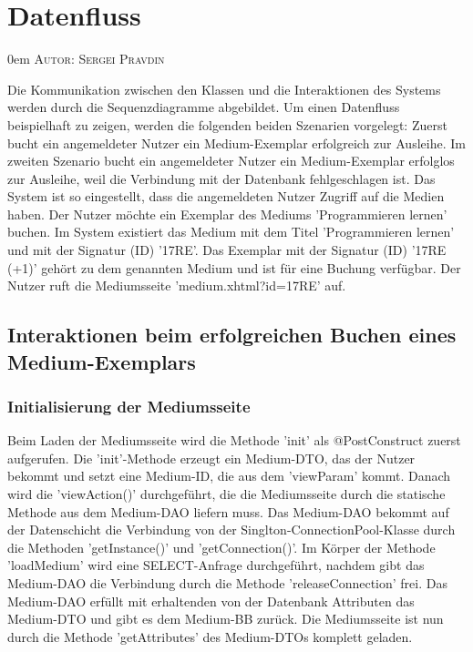 \documentclass{article}
\makeatletter
\newcommand{\sectionauthor}[1]{
	{\parindent 0em \large \scshape Autor: #1 \par \nobreak \vspace*{1em}}
	\@afterheading
}
\makeatother
\begin{document}






\newpage
\section{Datenfluss}
\sectionauthor{Sergei Pravdin}
Die Kommunikation zwischen den Klassen und die Interaktionen des Systems werden durch die Sequenzdiagramme abgebildet. Um einen Datenfluss beispielhaft zu zeigen, werden die folgenden beiden Szenarien vorgelegt: Zuerst bucht ein angemeldeter Nutzer ein Medium-Exemplar erfolgreich zur Ausleihe. Im zweiten Szenario bucht ein angemeldeter Nutzer ein Medium-Exemplar erfolglos zur Ausleihe, weil die Verbindung mit der Datenbank fehlgeschlagen ist. Das System ist so eingestellt, dass die angemeldeten Nutzer Zugriff auf die Medien haben. Der Nutzer möchte ein Exemplar des Mediums 'Programmieren lernen' buchen. Im System existiert das Medium mit dem Titel 'Programmieren lernen' und mit der Signatur (ID) '17RE'. Das Exemplar mit der Signatur (ID) '17RE (+1)' gehört zu dem genannten Medium und ist für eine Buchung verfügbar. Der Nutzer ruft die Mediumsseite 'medium.xhtml?id=17RE' auf.
\subsection{Interaktionen beim erfolgreichen Buchen eines Medium-Exemplars}
\subsubsection{Initialisierung der Mediumsseite}
Beim Laden der Mediumsseite wird die Methode 'init' als @PostConstruct zuerst aufgerufen. Die 'init'-Methode erzeugt ein Medium-DTO, das der Nutzer bekommt und setzt eine Medium-ID, die aus dem 'viewParam' kommt. Danach wird die 'viewAction()' durchgeführt, die die Mediumsseite durch die statische Methode aus dem Medium-DAO liefern muss. Das Medium-DAO bekommt auf der Datenschicht die Verbindung von der Singlton-ConnectionPool-Klasse durch die Methoden 'getInstance()' und 'getConnection()'. Im Körper der Methode 'loadMedium' wird eine SELECT-Anfrage durchgeführt, nachdem gibt das Medium-DAO die Verbindung durch die Methode 'releaseConnection' frei. Das Medium-DAO erfüllt mit erhaltenden von der Datenbank Attributen das Medium-DTO und gibt es dem Medium-BB zurück. Die Mediumsseite ist nun durch die Methode 'getAttributes' des Medium-DTOs komplett geladen.
\end{document}
